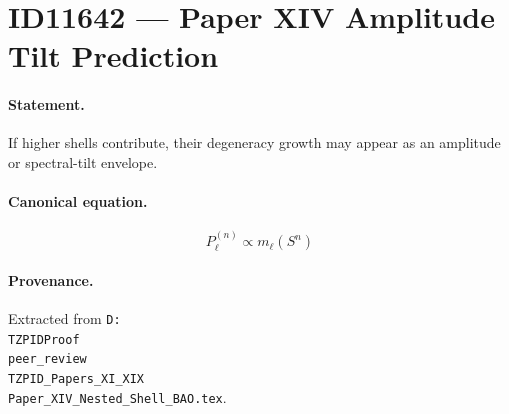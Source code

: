 \section*{ID11642 --- Paper XIV Amplitude Tilt Prediction}

\paragraph{Statement.}
If higher shells contribute, their degeneracy growth may appear as an amplitude or spectral-tilt envelope.

\paragraph{Canonical equation.}
\[
P_\ell^{(n)}\propto m_\ell(S^n)
\]

\paragraph{Provenance.}
Extracted from \texttt{D:\\TZPIDProof\\peer\_review\\TZPID\_Papers\_XI\_XIX\\Paper\_XIV\_Nested\_Shell\_BAO.tex}.
